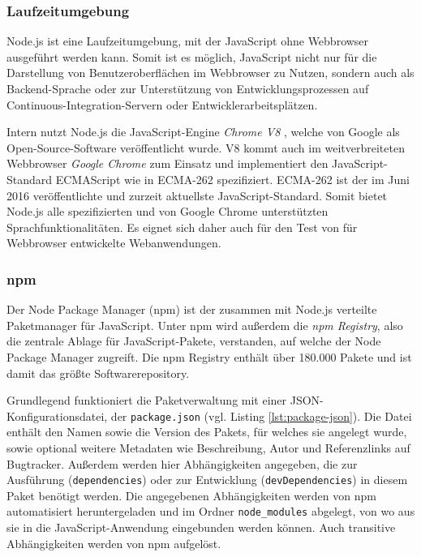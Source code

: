 \subsubsection{Laufzeitumgebung}
Node.js ist eine Laufzeitumgebung, mit der JavaScript ohne Webbrowser ausgeführt werden kann\cite[][1]{hughes2012einfuehrungnodejs}. Somit ist es möglich, JavaScript nicht nur für die Darstellung von Benutzeroberflächen im Webbrowser zu Nutzen, sondern auch als Backend-Sprache oder zur Unterstützung von Entwicklungsprozessen auf Continuous-Integration-Servern oder Entwicklerarbeitsplätzen.

Intern nutzt Node.js die JavaScript-Engine \textit{Chrome V8} \cite{nodejs}, welche von Google als Open-Source-Software veröffentlicht wurde. V8 kommt auch im weitverbreiteten Webbrowser \textit{Google Chrome} zum Einsatz und implementiert den JavaScript-Standard ECMAScript wie in ECMA-262 spezifiziert\cite{chromev8}. ECMA-262 ist der im Juni 2016 veröffentlichte und zurzeit aktuellste JavaScript-Standard\cite{ecma262}. Somit bietet Node.js alle spezifizierten und von Google Chrome unterstützten Sprachfunktionalitäten. Es eignet sich daher auch für den Test von für Webbrowser entwickelte Webanwendungen.

\subsubsection{npm}
Der Node Package Manager (npm) ist der zusammen mit Node.js verteilte Paketmanager für JavaScript. Unter npm wird außerdem die \textit{npm Registry}, also die zentrale Ablage für JavaScript-Pakete, verstanden, auf welche der Node Package Manager zugreift. \cite{npm-about} Die npm Registry enthält über 180.000 Pakete und ist damit das größte Softwarerepository\cite{modulecount}.

Grundlegend funktioniert die Paketverwaltung mit einer JSON-Konfigurationsdatei, der \texttt{package.json} (vgl. Listing \ref{lst:package-json}). Die Datei enthält den Namen sowie die Version des Pakets, für welches sie angelegt wurde, sowie optional weitere Metadaten wie Beschreibung, Autor und Referenzlinks auf Bugtracker. Außerdem werden hier Abhängigkeiten angegeben, die zur Ausführung (\texttt{dependencies}) oder zur Entwicklung (\texttt{devDependencies}) in diesem Paket benötigt werden. \cite{npm-packagejson}Die angegebenen Abhängigkeiten werden von npm automatisiert heruntergeladen und im Ordner \texttt{node\_modules} abgelegt, von wo aus sie in die JavaScript-Anwendung eingebunden werden können. Auch transitive Abhängigkeiten werden von npm aufgelöst. 

